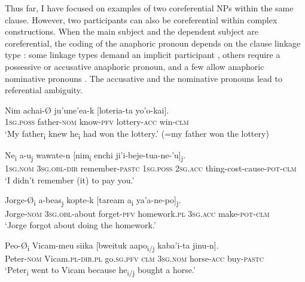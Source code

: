 \documentclass[output=paper]{langscibook}
\begin{document}
Thus far, I have focused on examples of two coreferential NPs within the same clause. However, two participants can also be coreferential within complex constructions. When the main subject and the dependent subject are coreferential, the coding of the anaphoric pronoun depends on the clause linkage type \citep{Guerrero2006}: some linkage types demand an implicit participant , others require a possessive  or accusative  anaphoric pronoun, and a few allow anaphoric nominative pronouns . The accusative and the nominative pronouns lead to referential ambiguity.



\ea%
    \label{ex:guerrero:32}

\ea
\label{ex:guerrero:32a}
\gll Nim achai-Ø ju’une’ea-k [loteria-ta       yo’o-kai].\\
  \textsc{1sg.poss}  father-\textsc{nom}  know-\textsc{pfv} lottery-\textsc{acc}   win-\textsc{clm}\\
\glt ‘My father\textsubscript{i} knew he\textsubscript{i} had won the lottery.’ (=my father won the lottery)

\ex
\label{ex:guerrero:32b}
\gll Ne\textsubscript{i} a-u\textsubscript{j} wawate-n  [nim\textsubscript{i} enchi  ji’i-beje-tua-ne-’u]\textsubscript{j}.\\
  1\textsc{sg.nom}  \textsc{3sg.obl-dir}  remember-\textsc{pastc}  1\textsc{sg.poss}  2\textsc{sg.acc}  thing\textsc{{}-}cost-cause\textsc{{}-pot-clm}\\
 \glt  ‘I didn’t remember (it) to pay you.’



\ex
\label{ex:guerrero:32c}
\gll Jorge-Ø\textsubscript{i} a-beas\textsubscript{j} kopte-k           [taream    a\textsubscript{i} ya’a-ne-po]\textsubscript{j}.\\
Jorge-\textsc{nom} 3\textsc{sg.obl-}about  forget-\textsc{pfv} homework.\textsc{pl}  3\textsc{sg.acc} make-\textsc{pot-clm}\\
\glt ‘Jorge forgot about doing the homework.’

\ex
\label{ex:guerrero:32d}
\gll Peo-Ø\textsubscript{i} Vicam-meu  siika    [bweituk  aapo\textsubscript{i/j} kaba’i-ta  jinu-n].\\
    Peter-\textsc{nom}    Vicam.\textsc{pl}{}-\textsc{dir.pl}  go\textsc{.sg.pfv}   \textsc{clm}  3\textsc{sg.nom}    horse-\textsc{acc}  buy-\textsc{pastc}\\
    \glt  ‘Peter\textsubscript{i} went to Vicam because he\textsubscript{i/j} bought a horse.’
\z
\z
\end{document}

